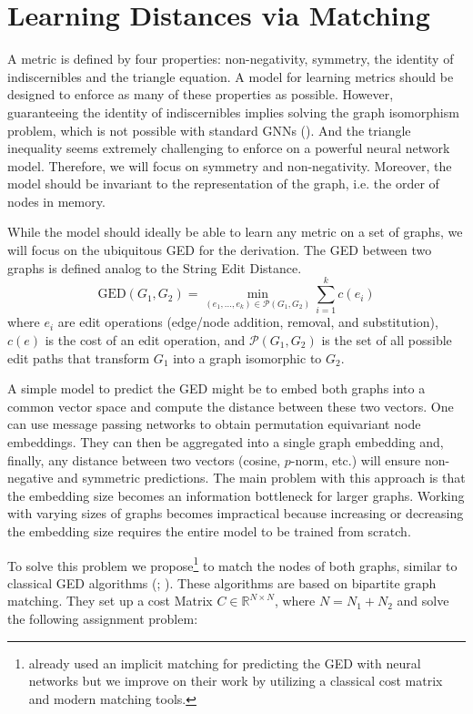 \section{Learning Distances via Matching}

A metric is defined by four properties: non-negativity, symmetry, the identity of indiscernibles and the triangle equation. A model for learning metrics should be designed to enforce as many of these properties as possible. However, guaranteeing the identity of indiscernibles implies solving the graph isomorphism problem, which is not possible with standard GNNs (\citealp{gin2019}). And the triangle inequality seems extremely challenging to enforce on a powerful neural network model. Therefore, we will focus on symmetry and non-negativity. Moreover, the model should be invariant to the representation of the graph, i.e. the order of nodes in memory.

While the model should ideally be able to learn any metric on a set of graphs, we will focus on the ubiquitous GED for the derivation. The GED between two graphs is defined analog to the String Edit Distance.
\begin{equation}
     \text{GED}(G_{1},G_{2}) = \min_{(e_{1},...,e_{k}) \in \mathcal{P}(G_{1},G_{2})} \sum_{i=1}^{k} c(e_{i})
\end{equation}
where $e_{i}$ are edit operations (edge/node addition, removal, and substitution), $c(e)$ is the cost of an edit operation, and $\mathcal{P}(G_{1},G_{2})$ is the set of all possible edit paths that transform $G_{1}$ into a graph isomorphic to $G_{2}$.

A simple model to predict the GED might be to embed both graphs into a common vector space and compute the distance between these two vectors. One can use message passing networks to obtain permutation equivariant node embeddings. They can then be aggregated into a single graph embedding and, finally, any distance between two vectors (cosine, $p$-norm, etc.) will ensure non-negative and symmetric predictions. The main problem with this approach is that the embedding size becomes an information bottleneck for larger graphs. Working with varying sizes of graphs becomes impractical because increasing or decreasing the embedding size requires the entire model to be trained from scratch.

To solve this problem we propose\footnote{\cite{riba2018} already used an implicit matching for predicting the GED with neural networks but we improve on their work by utilizing a classical cost matrix and modern matching tools.} to match the nodes of both graphs, similar to classical GED algorithms (\citealp{hungarian2009}; \citealp{frankhauser2011}). These algorithms are based on bipartite graph matching. They set up a cost Matrix $C \in \mathbb{R}^{N \times N}$, where $N = N_1 + N_2$ and solve the following assignment problem:

